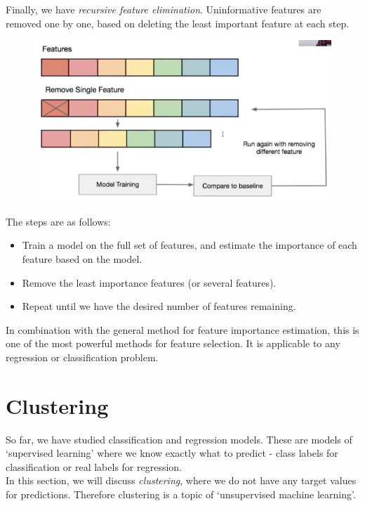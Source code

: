 Finally, we have \textit{recursive feature elimination}. Uninformative features are removed one by one, based on deleting the least important feature at each step. 

\begin{figure}[H]
\centering
\includegraphics[scale=0.3]{recursivefeature.png}
\end{figure}

The steps are as follows:
\begin{itemize}
\item Train a model on the full set of features, and estimate the importance of each feature based on the model.
\item Remove the least importance features (or several features).
\item Repeat until we have the desired number of features remaining.
\end{itemize}
In combination with the general method for feature importance estimation, this is one of the most powerful methods for feature selection. It is applicable to any regression or classification problem.






\newpage
\section{Clustering}

So far, we have studied classification and regression models. These are models of `supervised learning' where we know exactly what to predict - class labels for classification or real labels for regression.\\

In this section, we will discuss \textit{clustering}, where we do not have any target values for predictions. Therefore clustering is a topic of `unsupervised machine learning'.

